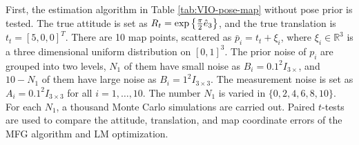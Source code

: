 First, the estimation algorithm in Table \ref{tab:VIO-pose-map} without pose prior is tested.
The true attitude is set as $R_t = \exp\left\{ \tfrac{\pi}{2}\hat{e}_3 \right\}$, and the true translation is $t_t = [5,0,0]^T$.
There are 10 map points, scattered as $\bar{p}_i = t_t + \xi_i$, where $\xi_i\in\mathbb{R}^3$ is a three dimensional uniform distribution on $[0,1]^3$.
The prior noise of $p_i$ are grouped into two levels, $N_1$ of them have small noise as $B_i = 0.1^2I_{3\times}$, and $10-N_1$ of them have large noise as $B_i = 1^2I_{3\times 3}$.
The measurement noise is set as $A_i = 0.1^2I_{3\times 3}$ for all $i=1,\ldots,10$.
The number $N_1$ is varied in $\{0,2,4,6,8,10\}$.
For each $N_1$, a thousand Monte Carlo simulations are carried out.
Paired $t$-tests are used to compare the attitude, translation, and map coordinate errors of the MFG algorithm and LM optimization.


